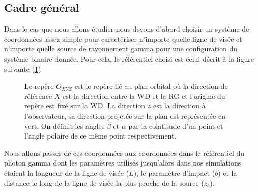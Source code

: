 \documentclass[a4paper,12pt,twoside]{article}
\begin{document}
\subsection{Cadre général}\label{sec: cadre général}

Dans le cas que nous allons étudier nous devons d'abord choisir un système de coordonnées assez simple pour caractériser n'importe quelle ligne de visée et n'importe quelle source de rayonnement gamma pour une configuration du système binaire donnée. Pour cela, le référentiel choisi est celui décrit à la figure suivante (\ref{fig: coordonnees systeme binaire})

\begin{figure}[H]
	\centering
    \caption{Le repère $O_{XYZ}$ est le repère lié au plan orbital où la direction de référence $X$ est la direction entre la WD et la RG et l'origine du repère est fixé sur la WD. La direction $z$ est la direction à l'observateur, sa direction projetée sur la plan est représentée en vert. On définit les angles $\beta$ et $\alpha$ par la colatitude d'un point et l'angle polaire de ce même point respectivement.}
    \label{fig: coordonnees systeme binaire}
\end{figure}

Nous allons passer de ces coordonnées aux coordonnées dans le référentiel du photon gamma dont les paramètres utilisés jusqu'alors dans nos simulations étaient la longueur de la ligne de visée ($L$), le paramètre d'impact ($b$) et la distance le long de la ligne de visée la plus proche de la source ($z_b$).
\end{document}
